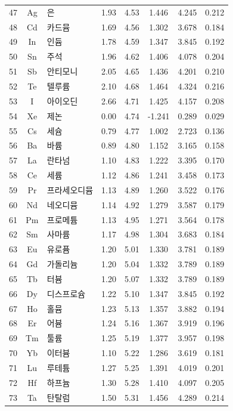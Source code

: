 \documentclass[12pt,a4paper]{article}
\begin{document}
\begin{longtable}{|c|c|p{2.5cm}|c|c|c|c|c|}
		47 & Ag & 은 & 1.93 & 4.53 & 1.446 & 4.245 & 0.212 \\
		48 & Cd & 카드뮴 & 1.69 & 4.56 & 1.302 & 3.678 & 0.184 \\
		49 & In & 인듐 & 1.78 & 4.59 & 1.347 & 3.845 & 0.192 \\
		50 & Sn & 주석 & 1.96 & 4.62 & 1.406 & 4.078 & 0.204 \\
		51 & Sb & 안티모니 & 2.05 & 4.65 & 1.436 & 4.201 & 0.210 \\
		52 & Te & 텔루륨 & 2.10 & 4.68 & 1.464 & 4.324 & 0.216 \\
		53 & I & 아이오딘 & 2.66 & 4.71 & 1.425 & 4.157 & 0.208 \\
		54 & Xe & 제논 & 0.00 & 4.74 & -1.241 & 0.289 & 0.029 \\
		55 & Cs & 세슘 & 0.79 & 4.77 & 1.002 & 2.723 & 0.136 \\
		56 & Ba & 바륨 & 0.89 & 4.80 & 1.152 & 3.165 & 0.158 \\
		57 & La & 란타넘 & 1.10 & 4.83 & 1.222 & 3.395 & 0.170 \\
		58 & Ce & 세륨 & 1.12 & 4.86 & 1.241 & 3.458 & 0.173 \\
		59 & Pr & 프라세오디뮴 & 1.13 & 4.89 & 1.260 & 3.522 & 0.176 \\
		60 & Nd & 네오디뮴 & 1.14 & 4.92 & 1.279 & 3.587 & 0.179 \\
		61 & Pm & 프로메튬 & 1.13 & 4.95 & 1.271 & 3.564 & 0.178 \\
		62 & Sm & 사마륨 & 1.17 & 4.98 & 1.304 & 3.683 & 0.184 \\
		63 & Eu & 유로퓸 & 1.20 & 5.01 & 1.330 & 3.781 & 0.189 \\
		64 & Gd & 가돌리늄 & 1.20 & 5.04 & 1.332 & 3.789 & 0.189 \\
		65 & Tb & 터븀 & 1.20 & 5.07 & 1.332 & 3.789 & 0.189 \\
		66 & Dy & 디스프로슘 & 1.22 & 5.10 & 1.347 & 3.845 & 0.192 \\
		67 & Ho & 홀뮴 & 1.23 & 5.13 & 1.357 & 3.882 & 0.194 \\
		68 & Er & 어븀 & 1.24 & 5.16 & 1.367 & 3.919 & 0.196 \\
		69 & Tm & 툴륨 & 1.25 & 5.19 & 1.377 & 3.957 & 0.198 \\
		70 & Yb & 이터븀 & 1.10 & 5.22 & 1.286 & 3.619 & 0.181 \\
		71 & Lu & 루테튬 & 1.27 & 5.25 & 1.391 & 4.019 & 0.201 \\
		72 & Hf & 하프늄 & 1.30 & 5.28 & 1.410 & 4.097 & 0.205 \\
		73 & Ta & 탄탈럼 & 1.50 & 5.31 & 1.456 & 4.289 & 0.214 \\

\end{longtable}
\end{document}
